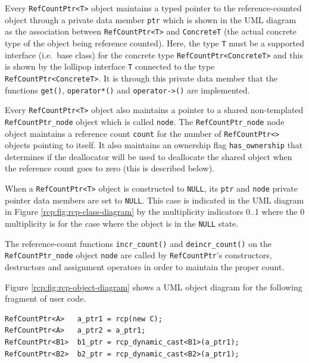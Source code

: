 Every {}\texttt{RefCountPtr<T>} object maintains a typed pointer to
the reference-counted object through a private data member
{}\texttt{ptr} which is shown in the UML diagram as the association
between {}\texttt{RefCountPtr<T>} and {}\texttt{ConcreteT} (the actual
concrete type of the object being reference counted).  Here, the type
{}\texttt{T} must be a supported interface (i.e.~base class) for the
concrete type {}\texttt{RefCountPtr<ConcreteT>} and this is shown by
the lollipop interface {}\texttt{T} connected to the type
{}\texttt{RefCountPtr<ConcreteT>}.  It is through this private data
member that the functions {}\texttt{get()}, {}\texttt{operator*()} and
{}\texttt{operator->()} are implemented.

Every {}\texttt{RefCountPtr<T>} object also maintains a pointer to a
shared non-templated {}\texttt{RefCountPtr\-\_node} object which is
called {}\texttt{node}.  The {}\texttt{RefCountPtr\-\_node} node
object maintains a reference count {}\texttt{count} for the number of
{}\texttt{RefCountPtr<>} objects pointing to itself.  It also
maintains an ownership flag {}\texttt{has\-\_ownership} that
determines if the deallocator will be used to deallocate the shared
object when the reference count goes to zero (this is described
below).

When a {}\texttt{RefCountPtr<T>} object is constructed to
{}\texttt{NULL}, its {}\texttt{ptr} and {}\texttt{node} private
pointer data members are set to {}\texttt{NULL}.  This case is
indicated in the UML diagram in Figure
{}\ref{rcp:fig:rcp-class-diagram} by the multiplicity indicators 0..1
where the 0 multiplicity is for the case where the object is in the
{}\texttt{NULL} state.

The reference-count functions {}\texttt{incr\_count()} and
{}\texttt{deincr\_count()} on the {}\texttt{RefCountPtr\-\_node}
object {}\texttt{node} are called by {}\texttt{RefCountPtr}'s
constructors, destructors and assignment operators in order to
maintain the proper count.

Figure {}\ref{rcp:fig:rcp-object-diagram} shows a UML
object diagram for the following fragment of user code.
%
{\scriptsize\begin{verbatim}
RefCountPtr<A>   a_ptr1 = rcp(new C);
RefCountPtr<A>   a_ptr2 = a_ptr1;
RefCountPtr<B1>  b1_ptr = rcp_dynamic_cast<B1>(a_ptr1);
RefCountPtr<B2>  b2_ptr = rcp_dynamic_cast<B2>(a_ptr1);
\end{verbatim}}

